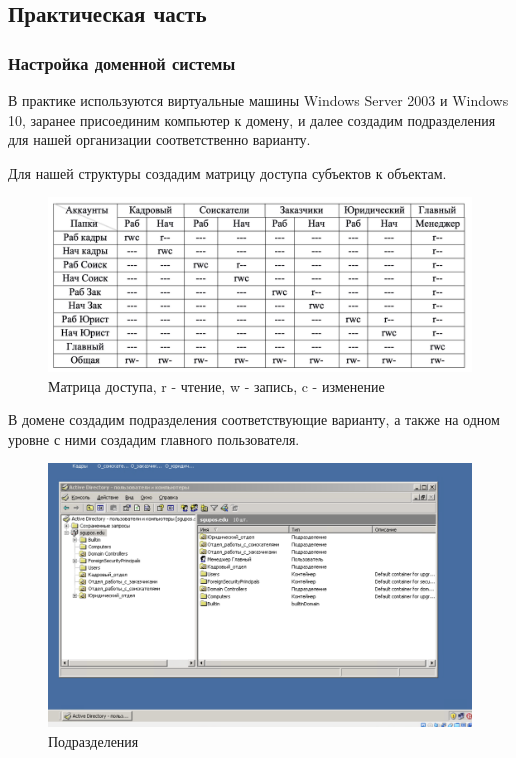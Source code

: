 \subsection{Практическая часть}
\subsubsection{Настройка доменной системы}
В практике используются виртуальные машины Windows Server 2003 и Windows 10, 
заранее присоединим компьютер к домену, и далее создадим подразделения для
нашей организации соответственно варианту.

Для нашей структуры создадим матрицу доступа субъектов к объектам.
\begin{figure}[H]
  \centering
  \includegraphics[width=1\textwidth]{pict/102}
  \caption{Матрица доступа, r - чтение, w - запись, c - изменение}
  \label{fig:101}
\end{figure}

В домене создадим подразделения соответствующие варианту, а также на одном уровне с ними создадим 
главного пользователя.

\begin{figure}[H]
  \centering
  \includegraphics[width=1\textwidth]{pict/prac/3}
  \caption{Подразделения}
  \label{fig:11}
\end{figure}

